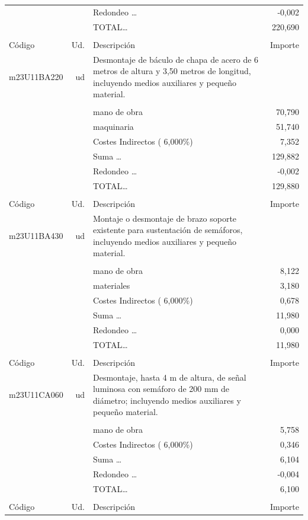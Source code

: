 \begin{supertabular}{l r p{60mm} r}
&&Redondeo \ldots&    {-}0,002\\%
%
&&TOTAL\ldots&   220,690\\%
&&&\\%
Código&Ud.&Descripción&Importe\\%
\hline%
m23U11BA220&ud&Desmontaje de báculo de chapa de acero de 6 metros de altura y 3,50 metros de longitud, incluyendo medios auxiliares y pequeño material.&\\%
&&&\\%
&&mano de obra&    70,790\\%
&&maquinaria&    51,740\\%
&&Costes Indirectos (     6,000\%)&     7,352\\%
&&Suma \ldots&   129,882\\%
&&Redondeo \ldots&    {-}0,002\\%
%
&&TOTAL\ldots&   129,880\\%
&&&\\%
Código&Ud.&Descripción&Importe\\%
\hline%
m23U11BA430&ud&Montaje o desmontaje de brazo soporte existente para sustentación de semáforos, incluyendo medios auxiliares y pequeño material.&\\%
&&&\\%
&&mano de obra&     8,122\\%
&&materiales&     3,180\\%
&&Costes Indirectos (     6,000\%)&     0,678\\%
&&Suma \ldots&    11,980\\%
&&Redondeo \ldots&     0,000\\%
%
&&TOTAL\ldots&    11,980\\%
&&&\\%
Código&Ud.&Descripción&Importe\\%
\hline%
m23U11CA060&ud&Desmontaje, hasta 4 m de altura, de señal luminosa con semáforo de 200 mm de diámetro; incluyendo medios auxiliares y pequeño material.&\\%
&&&\\%
&&mano de obra&     5,758\\%
&&Costes Indirectos (     6,000\%)&     0,346\\%
&&Suma \ldots&     6,104\\%
&&Redondeo \ldots&    {-}0,004\\%
%
&&TOTAL\ldots&     6,100\\%
&&&\\%
Código&Ud.&Descripción&Importe\\%

\end{supertabular}
